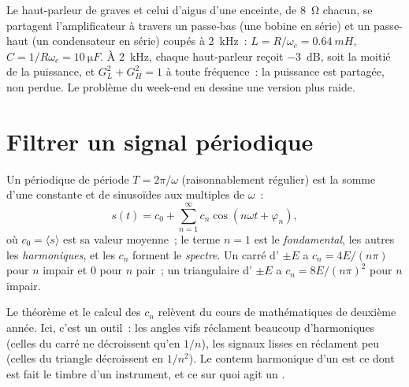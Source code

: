 \begin{example}\label{ex:b1:filters-transfer-functions:crossover}
Le haut-parleur de graves et celui d'aigus d'une enceinte, de
\qty{8}{\ohm} chacun, se partagent l'amplificateur à travers un
passe-bas (une bobine en série) et un passe-haut (un condensateur en
série) coupés à \qty{2}{kHz}~: $L = R/\omega_c = \qty{0.64}{mH}$,
$C = 1/R\omega_c = \qty{10}{\micro F}$. À \qty{2}{kHz}, chaque
haut-parleur reçoit \qty{-3}{dB}, soit la moitié de la puissance, et
$G_L^2 + G_H^2 = 1$ à toute fréquence~: la puissance est partagée, non
perdue. Le problème du week-end en dessine une version plus raide.
\end{example}

\section{Filtrer un signal périodique}

\begin{theorem}\label{thm:b1:filters-transfer-functions:fourier}
Un  périodique de période $T = 2\pi/\omega$ (raisonnablement
régulier) est la somme d'une constante et de sinusoïdes aux multiples de
$\omega$~:
\[
s(t) = c_0 + \sum_{n = 1}^{\infty} c_n\cos(n\omega t + \varphi_n),
\]
où $c_0 = \langle s\rangle$ est sa valeur moyenne~; le terme $n = 1$ est
le \emph{fondamental}, les autres les \emph{harmoniques}, et les
 $c_n$ forment le \emph{spectre}. Un  carré d'
$\pm E$ a $c_n = 4E/(n\pi)$ pour $n$ impair et $0$ pour $n$ pair~; un
 triangulaire d' $\pm E$ a $c_n = 8E/(n\pi)^2$ pour $n$ impair.
\end{theorem}
\admitted

\begin{remark}\label{rem:b1:filters-transfer-functions:fourier}
Le théorème et le calcul des $c_n$ relèvent du cours de mathématiques de
deuxième année. Ici, c'est un outil~: les angles vifs réclament beaucoup
d'harmoniques (celles du  carré ne décroissent qu'en $1/n$), les
signaux lisses en réclament peu (celles du triangle décroissent en
$1/n^2$). Le contenu harmonique d'un  est ce dont est fait le
timbre d'un instrument, et ce sur quoi agit un .
\end{remark}

